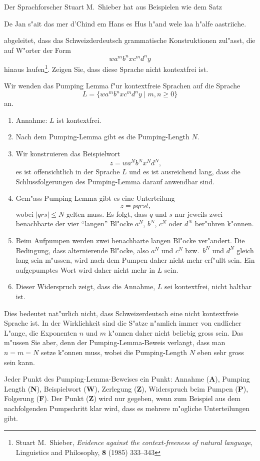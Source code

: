 Der Sprachforscher Stuart M.~Shieber hat aus Beispielen wie dem Satz
\begin{center}
De Jan s"ait das mer d'Chind em Hans es Hus h"and wele laa h"alfe aastriiche.
\end{center}
abgeleitet, dass das Schweizderdeutsch grammatische Konstruktionen
zul"asst, die auf W"orter der Form
\[
wa^mb^nxc^md^ny
\]
hinaus laufen\footnote{Stuart M.~Shieber,
{\em Evidence against the context-freeness of natural language},
Linguistics and Philosophy, {\bf 8} (1985) 333--343}.
Zeigen Sie, dass diese Sprache nicht kontextfrei ist.

\begin{loesung}
Wir wenden das Pumping Lemma f"ur kontextfreie Sprachen auf die Sprache
\[
L=\{
wa^mb^nxc^md^ny
\;|\; m,n\ge 0
\}
\]
an.
\begin{enumerate}
\item Annahme: $L$ ist kontextfrei.
\item Nach dem Pumping-Lemma gibt es die Pumping-Length $N$.
\item Wir konstruieren das Beispielwort
\[
z=wa^Nb^Nx^Nd^N,
\]
es ist offensichtlich in der Sprache $L$
und es ist ausreichend lang, dass die Schlussfolgerungen des Pumping-Lemma
darauf anwendbar sind.
\item
Gem"ass Pumping Lemma gibt es eine Unterteilung
\[
z=pqrst,
\]
wobei $|qrs|\le N$ gelten muss.
Es folgt, dass $q$ und $s$ nur jeweils zwei benachbarte der
vier ``langen'' Bl"ocke $a^N$, $b^N$, $c^N$ oder $d^N$ ber"uhren k"onnen.
\item 
Beim Aufpumpen werden zwei benachbarte langen Bl"ocke ver"andert.
Die Bedingung, dass alternierende Bl"ocke, also $a^N$ und $c^N$
bzw.~$b^N$ und $d^N$ gleich lang sein m"ussen, wird nach dem Pumpen
daher nicht mehr erf"ullt sein.
Ein aufgepumptes Wort wird daher nicht mehr in $L$ sein.
\item Dieser Widerspruch zeigt, dass die Annahme, $L$ sei kontextfrei,
nicht haltbar ist.
\end{enumerate}
\end{loesung}

\begin{diskussion}
Dies bedeutet nat"urlich nicht, dass Schweizerdeutsch eine nicht
kontextfreie Sprache ist.
In der Wirklichkeit sind die S"atze n"amlich immer von endlicher L"ange,
die Exponenten $n$ und $m$ k"onnen daher nicht beliebig gross sein.
Das m"ussen Sie aber, denn der Pumping-Lemma-Beweis verlangt, dass man
$n=m=N$ setze k"onnen muss, wobei die Pumping-Length $N$ eben sehr gross
sein kann.
\end{diskussion}

\begin{bewertung}
Jeder Punkt des Pumping-Lemma-Beweises ein Punkt:
Annahme ({\bf A}), Pumping Length ({\bf N}), Beispielwort ({\bf W}),
Zerlegung ({\bf Z}), Widerspruch beim Pumpen ({\bf P}), 
Folgerung ({\bf F}).
Der Punkt ({\bf Z}) wird nur gegeben, wenn zum Beispiel aus dem nachfolgenden
Pumpschritt klar wird, dass es mehrere m"ogliche Unterteilungen gibt.
\end{bewertung}

